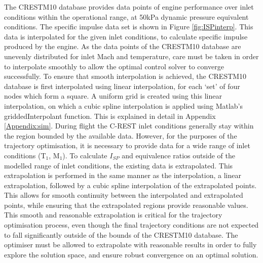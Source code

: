 The \textsf{CRESTM10} database provides data points of engine performance over inlet conditions within the operational range, at 50kPa dynamic pressure equivalent conditions. The specific impulse data set is shown in Figure \ref{fig:ISPinterp}. This data is interpolated for the given inlet conditions, to calculate specific impulse produced by the engine. As the data points of the \textsf{CRESTM10} database are unevenly distributed for inlet Mach and temperature, care must be taken in order to interpolate smoothly to allow the optimal control solver to converge successfully. To ensure that smooth interpolation is achieved, the \textsf{CRESTM10} database is first interpolated using linear interpolation, for each `set' of four nodes which form a square. A uniform grid is created using this linear interpolation, on which a cubic spline interpolation is applied using Matlab's \textsf{griddedInterpolant} function. This is explained in detail in Appendix \ref{Appendix:sim}. During flight the C-REST inlet conditions generally stay within the region bounded by the available data. However, for the purposes of the trajectory optimisation, it is necessary to provide data for a wide range of inlet conditions (T$_1$, M$_1$). To calculate $I_{SP}$ and equivalence ratios outside of the modelled range of inlet conditions, the existing data is extrapolated. This extrapolation is performed in the same manner as the interpolation, a linear extrapolation, followed by a cubic spline interpolation of the extrapolated points. This allows for smooth continuity between the interpolated and extrapolated points, while ensuring that the extrapolated regions provide reasonable values. This smooth and reasonable extrapolation is critical for the trajectory optimisation process, even though the final trajectory conditions are not expected to fall significantly outside of the bounds of the \textsf{CRESTM10} database. The optimiser must be allowed to extrapolate with reasonable results in order to fully explore the solution space, and ensure robust convergence on an optimal solution. 

